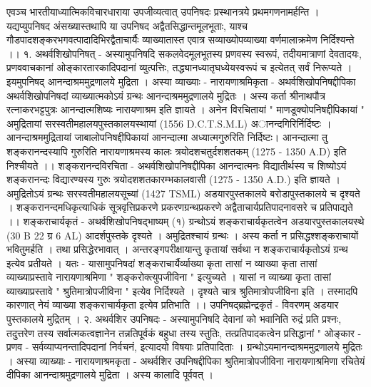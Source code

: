 एवञ्च भारतीयाध्यात्मिकविचारधाराया उपजीव्यत्वात् उपनिषदः प्रस्थानत्रये प्रथमगणनामर्हन्ति । यद्यप्युपनिषद अंसख्यास्तथापि या उपनिषद अद्वैतसिद्धान्तमूलभूताः, याश्च गौडपादशङ्करभगवत्पादादिभिरद्वैताचार्यैः व्याख्यातास्त एवात्र सव्याख्योपव्याख्या वर्णमालाक्रमेण निर्दिश्यन्ते ।। 
१. अथर्वशिखोपनिषत् - 
अस्यामुपनिषदि सकलवेदमूलभूतस्य प्रणवस्य स्वरूपं, तदीयमात्राणां देवतादयः, प्रणववाचकानां ओङ्कारतारकादिपदानां व्युत्पत्तिः, तद्ध्यानध्यातृघध्येयस्वरूपं च इत्येतत् सर्वं निरूप्यते । इयमुपनिषद् आनन्दाश्रममुद्रणालये मुद्रिता । अस्या व्याख्याः - 
नारायणाश्रमिकृता - अथर्वशिखोपनिषद्दीपिका 
अथर्वशिखोपनिषदां व्याख्यात्मकोऽयं ग्रन्थः आनन्दाश्रममुद्रणालये मुद्रितः । अस्य कर्ता श्रीनाथपौत्र रत्नाकरभट्टपुत्रः आनन्दात्मशिष्यः नारायणाश्रम इति ज्ञायते । अनेन विरचितायां " माणडूक्योपनिषद्दीपिकायां " अमुद्रितायां सरस्वतीमहालयपुस्तकालयस्थायां (1556 D.C.T.S.M.L) अानन्दगिरिर्निर्दिष्टः । आनन्दाश्रममुद्रितायां जाबालोपनिषद्दीपिकायां आनन्दात्मा अध्यात्मगुरुरिति निर्दिष्टः। आनन्दात्मा तु शङ्करानन्दस्यापि गुरुरिति नारायणाश्रमस्य कालः त्रयोदशचतुर्दशशतकम् (1275 - 1350 A.D) इति निश्चीयते ।। 
शङ्करानन्दविरचिता - अथर्वशिखोपनिषद्दीपिका 
आनन्दात्मनः विद्यातीर्थस्य च शिष्योऽयं शङ्करानन्दः विद्यारण्यस्य गुरुः त्रयोदशशतकारम्भकालवासी (1275 - 1350 A.D.) इति ज्ञायते । अमुद्रितोऽयं ग्रन्थः सरस्वतीमहालयसूच्यां (1427 TSML) अडयारपुस्तकालये बरोडापुस्तकालये च दृश्यते । शङ्करानन्दमधिकृत्याधिकं सूत्रवृत्तिप्रकरणे प्रकरणग्रन्थप्रकरणे अद्वैताचार्यप्रतिपादनावसरे च प्रतिपाद्यते ।। 
शङ्कराचार्यकृतं - अथर्वशिखोपनिषद्भाष्यम् (१) 
ग्रन्थोऽयं शङ्कराचार्यकृतत्वेन अडयारपुस्तकालयस्थे (30 B 22 ग्र 6 AL) आदर्शपुस्तके दृश्यते । अमुद्रितश्चायं ग्रन्थः । अस्य कर्ता न प्रसिद्धश्शङ्कराचायों भवितुमर्हति । तथा प्रसिद्धेरभावात् । अन्तरङ्गपरीक्षायान्तु कृतायां सर्वथा न शङ्कराचार्यकृतोऽयं ग्रन्थ इत्येव प्रतीयते । यतः - यासामुपनिषदां शङ्कराचार्यैर्व्याख्या कृता तासां न व्याख्या कृता तासां व्याख्याप्रस्तावे नारायणाश्रमिणा " शङ्करोक्त्युपजीविना " इत्युच्यते । यासां न व्याख्या कृता तासां व्याख्याप्रस्तावे " श्रुतिमात्रोपजीविना " इत्येव निर्दिश्यते । दृश्यते चात्र श्रुतिमात्रोपजीविना इति । तस्मादपि कारणात् नेयं व्याख्या शङ्कराचार्यकृता इत्येव प्रतिभाति ।। 
उपनिषद्ब्रह्मेन्द्रकृतं - विवरणम् अडयार पुस्तकालये मुद्रितम् । 
२. अथर्वशिर उपनिषदः - 
अस्यामुपनिषदि देवानां को भवानिति रुद्रं प्रति प्रश्नः, तदुत्तरेण तस्य सर्वात्मकत्वज्ञानेन तन्नतिपूर्वकं बहुधा तस्य स्तुतिः, तत्प्रतिपादकत्वेन प्रसिद्धानां " ओङ्कार - प्रणव - सर्वव्याप्यनन्तादिपदानां निर्वचनं, इत्यादयो विषयाः प्रतिपादिताः । ग्रन्थोऽयमानन्दाश्रममुद्रणालये मुद्रितः । अस्या व्याख्याः - 
नारायणाश्रमकृता - अथर्वशिर उपनिषद्दीपिका 
श्रुतिमात्रोपजीविना नारायणाश्रमिणा रचितेयं दीपिका आनन्दाश्रमुद्रणालये मुद्रिता । अस्य कालादि पूर्ववत् । 
